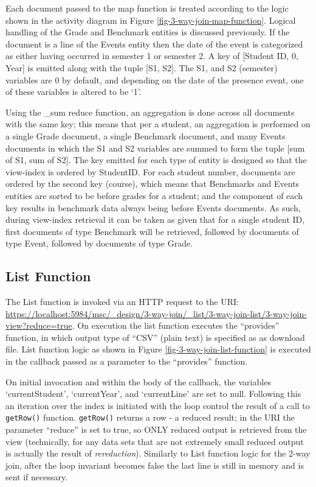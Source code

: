 Each document passed to the map function is treated according to the logic shown in the activity diagram in Figure \ref{fig-3-way-join-map-function}. Logical handling of the Grade and Benchmark entities is discussed previously. If the document is a line of the Events entity then the date of the event is categorized as either having occurred in semester 1 or semester 2. A key of [Student ID, 0, Year] is emitted along with the tuple [S1, S2]. The S1, and S2 (semester) variables are 0 by default, and depending on the date of the presence event, one of these variables is altered to be `1'.

Using the \_sum reduce function, an aggregation is done across all documents with the same key; this means that per a student, an aggregation is performed on a single Grade document, a single Benchmark document, and many Events documents in which the S1 and S2 variables are summed to form the tuple [sum of S1, sum of S2]. The key emitted for each type of entity is designed so that the view-index is ordered by StudentID. For each student number, documents are ordered by the second key (course), which means that Benchmarks and Events entities are sorted to be before grades for a student; and the  component of each key results in benchmark data always being before Events documents. As such, during view-index retrieval it can be taken as given that for a single student ID, first documents of type Benchmark will be retrieved, followed by documents of type Event, followed by documents of type Grade.



\subsection{List Function}
The List function is invoked via an HTTP request to the URI: \url{https://localhost:5984/msc/\_design/3-way-join/\_list/3-way-join-list/3-way-join-view?reduce=true}. On execution the list function executes the ``provides'' function, in which output type of ``CSV'' (plain text) is specified as as download file. List function logic as shown in Figure \ref{fig-3-way-join-list-function} is executed in the callback passed as a parameter to the ``provides'' function.

On initial invocation and within the body of the callback, the variables `currentStudent', `currentYear', and `currentLine' are set to null. Following this an iteration over the index is initiated with the loop control the result of a call to \texttt{getRow()} function. \texttt{getRow()} returns a row - a reduced result; in the URI the parameter ``reduce'' is set to true, so ONLY reduced output is retrieved from the view (technically, for any data sets that are not extremely small reduced output is actually the result of \textit{rereduction}). Similarly to List function logic for the 2-way join, after the loop invariant becomes false the last line is still in memory and is sent if necessary.

